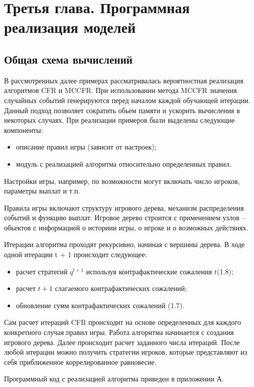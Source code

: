\chapter{Третья глава. Программная реализация моделей}
\label{cha:ch_3}
\section{Общая схема вычислений}

\par
В рассмотренных далее примерах рассматривалась вероятностная реализация алгоритмов CFR и MCCFR. При использовании метода MCCFR значения случайных событий генерируются перед началом каждой обучающей итерации. Данный подход позволяет сократить обьем памяти и ускорить вычисления в некоторых случаях\cite{MCCFR}.
При реализации примеров были выделены следующие компоненты:
\begin{itemize}
	\item описание правил игры (зависит от настроек);
	\item модуль с реализацией алгоритма относительно определенных правил.
\end{itemize}
\par
Настройки игры, например, по возможности могут включать число игроков, параметры выплат и т.п.
\par
Правила игры включают структуру игрового дерева, механизм распределения событий и функцию выплат. Игровое дерево строится с применением узлов -- обьектов с информацией о историии игры, о игроке и о возможных действиях.
\par
Итерации алгоритма проходят рекурсивно, начиная с вершины дерева. В ходе одной итерации t + 1 происходит следующее:
\begin{itemize}
\item расчет стратегий $q^{t + 1}$ используя контрафактические сожаления $t$(1.8);
\item расчет $t + 1$ слагаемого контрафактических сожалений;
\item обновление сумм контрафактических сожалений (1.7).
\end{itemize}
\par
Сам расчет итераций CFR происходит на основе определенных для каждого конкретного случая правил игры. Работа алгоритма начинается с создания игрового дерева. Далее происходит расчет заданного числа итераций. После любой итерации можно получить стратегии игроков, которые представляют из себя приближенное коррелированное равновесие.
\par
Программный код с реализацией алгоритма приведен в приложении А.

